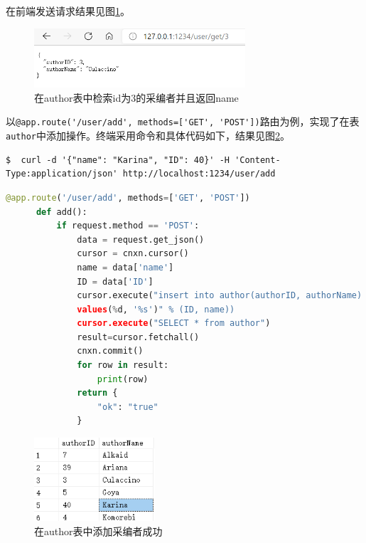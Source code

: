 \documentclass[11pt]{article}
\begin{document}
  在前端发送请求结果见图\ref{fig:userget}。
  \begin{figure}[h]
    \centering
    \includegraphics[width=0.7\textwidth]{userget.png}
    \caption{在author表中检索id为3的采编者并且返回name}
    \label{fig:userget}
  \end{figure}

  以\lstinline|@app.route('/user/add', methods=['GET', 'POST'])|路由为例，实现了在表\verb|author|中添加操作。终端采用命令和具体代码如下，结果见图\ref{fig:useradd}。

  \begin{commandline}
    \begin{verbatim}
$  curl -d '{"name": "Karina", "ID": 40}' -H 'Content-Type:application/json' http://localhost:1234/user/add
    \end{verbatim}
  \end{commandline}

  \begin{file}[app.py]
    \begin{lstlisting}[language=Python]
      @app.route('/user/add', methods=['GET', 'POST'])
      def add():
          if request.method == 'POST':
              data = request.get_json()
              cursor = cnxn.cursor()
              name = data['name']
              ID = data['ID']
              cursor.execute("insert into author(authorID, authorName) 
              values(%d, '%s')" % (ID, name))
              cursor.execute("SELECT * from author")
              result=cursor.fetchall()
              cnxn.commit()
              for row in result:
                  print(row)
              return {
                  "ok": "true"
              }
    \end{lstlisting}
  \end{file}

  \begin{figure}[h]
    \centering
    \includegraphics[width=0.4\textwidth]{useradd.png}
    \caption{在author表中添加采编者成功}
    \label{fig:useradd}
  \end{figure}
\end{document}
